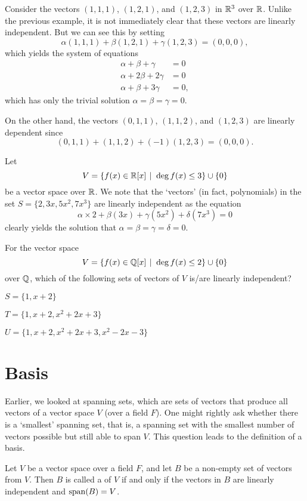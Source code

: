 \begin{example}
    Consider the vectors $(1, 1, 1)$, $(1, 2, 1)$, and $(1, 2, 3)$ in $\mathbb{R}^3$ over $\mathbb{R}$. Unlike the previous example, it is not immediately clear that these vectors are linearly independent. But we can see this by setting
    \[
        \alpha(1, 1, 1) + \beta(1, 2, 1) + \gamma(1, 2, 3) = (0, 0, 0),
    \]
    which yields the system of equations
    \begin{align*}
        \alpha + \beta + \gamma &= 0\\
        \alpha + 2\beta + 2\gamma &= 0\\
        \alpha + \beta + 3\gamma &= 0,
    \end{align*}
    which has only the trivial solution $\alpha = \beta = \gamma = 0$.

    On the other hand, the vectors $(0, 1, 1)$, $(1, 1, 2)$, and $(1, 2, 3)$ are linearly dependent since
    \[
        (0, 1, 1) + (1, 1, 2) + (-1)(1, 2, 3) = (0, 0, 0).
    \]
\end{example}

\begin{example}
    Let
    \[
        V = \{f(x) \in \R[x] \vert \deg f(x) \leq 3\} \cup \{0\}
    \]
    be a vector space over $\mathbb{R}$. We note that the `vectors' (in fact, polynomials) in the set $S = \{2, 3x, 5x^2, 7x^3\}$ are linearly independent as the equation
    \[
        \alpha\times2 + \beta(3x) + \gamma(5x^2) + \delta(7x^3) = 0
    \]
    clearly yields the solution that $\alpha = \beta = \gamma = \delta = 0$.
\end{example}

\begin{exercise}\label{exercise-polynomial-of-degree-at-most-2-vector-space}
    For the vector space
    \[
        V = \{f(x) \in \Q[x] \vert \deg f(x) \leq 2\} \cup \{0\}
    \]
    over $\mathbb{Q}$, which of the following sets of vectors of $V$ is/are linearly independent?
    \begin{partquestions}{\alph*}
        \item $S = \{1, x + 2\}$
        \item $T = \{1, x + 2, x^2 + 2x + 3\}$
        \item $U = \{1, x + 2, x^2 + 2x + 3, x^2 - 2x - 3\}$
    \end{partquestions}
\end{exercise}

\section{Basis}
Earlier, we looked at spanning sets, which are sets of vectors that produce all vectors of a vector space $V$ (over a field $F$). One might rightly ask whether there is a `smallest' spanning set, that is, a spanning set with the smallest number of vectors possible but still able to span $V$. This question leads to the definition of a basis.
\begin{definition}
    Let $V$ be a vector space over a field $F$, and let $B$ be a non-empty set of vectors from $V$. Then $B$ is called a  of $V$ if and only if the vectors in $B$ are linearly independent and $\mathrm{span}(B) = V$.
\end{definition}

